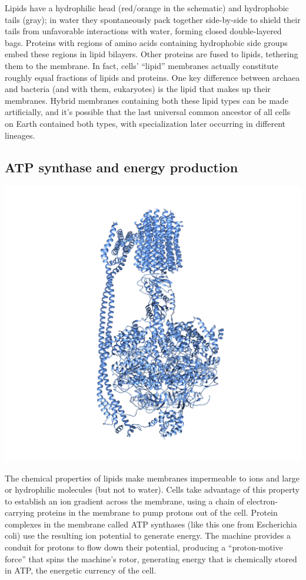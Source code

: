 \documentclass[]{tufte-book}
\begin{document}
Lipids have a hydrophilic head (red/orange in the schematic) and
hydrophobic tails (gray); in water they spontaneously pack together
side-by-side to shield their tails from unfavorable interactions with
water, forming closed double-layered bags. Proteins with regions of
amino acids containing hydrophobic side groups embed these regions in
lipid bilayers. Other proteins are fused to lipids, tethering them to
the membrane. In fact, cells' ``lipid'' membranes actually constitute
roughly equal fractions of lipids and proteins. One key difference
between archaea and bacteria (and with them, eukaryotes) is the lipid
that makes up their membranes. Hybrid membranes containing both these
lipid types can be made artificially, and it's possible that the last
universal common ancestor of all cells on Earth contained both types,
with specialization later occurring in different lineages.

\hypertarget{ATP_synthase_and_energy_production}{\subsection{ATP
synthase and energy
production}\label{ATP_synthase_and_energy_production}}

\includegraphics{img/02_schematic/2_1_2_ATPsynthase}

The chemical properties of lipids make membranes impermeable to ions and
large or hydrophilic molecules (but not to water). Cells take advantage
of this property to establish an ion gradient across the membrane, using
a chain of electron-carrying proteins in the membrane to pump protons
out of the cell. Protein complexes in the membrane called ATP synthases
(like this one from Escherichia coli) use the resulting ion potential to
generate energy. The machine provides a conduit for protons to flow down
their potential, producing a ``proton-motive force'' that spins the
machine's rotor, generating energy that is chemically stored in ATP, the
energetic currency of the cell.
\end{document}
